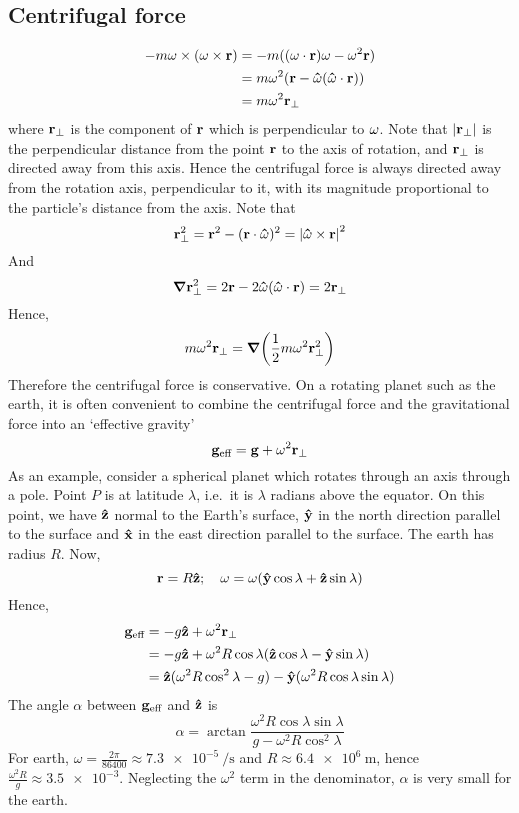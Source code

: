 \subsection{Centrifugal force}
\begin{align*}
	-m\vb\omega \times (\vb\omega \times \vb r) & = -m((\vb\omega \cdot \vb r)\vb\omega - \vb\omega^2\vb r) \\
	                                            & = m\omega^2(\vb r - \vu\omega(\vu\omega \cdot \vb r))     \\
	                                            & = m\omega^2 \vb r_\perp
\end{align*}
where \(\vb r_\perp\) is the component of \(\vb r\) which is perpendicular to \(\vb\omega\).
Note that \(\abs{\vb r_\perp}\) is the perpendicular distance from the point \(\vb r\) to the axis of rotation, and \(\vb r_\perp\) is directed away from this axis.
Hence the centrifugal force is always directed away from the rotation axis, perpendicular to it, with its magnitude proportional to the particle's distance from the axis.
Note that
\[
	\vb r_\perp^2 = \vb r^2 - (\vb r \cdot \vu\omega)^2 = \abs{\vu\omega \times \vb r}^2
\]
And
\[
	\grad \vb r_\perp^2 = 2\vb r - 2\vu\omega(\vu\omega \cdot \vb r) = 2\vb r_\perp
\]
Hence,
\[
	m\omega^2\vb r_\perp = \grad(\frac{1}{2}m\omega^2\vb r_\perp^2)
\]
Therefore the centrifugal force is conservative.
On a rotating planet such as the earth, it is often convenient to combine the centrifugal force and the gravitational force into an `effective gravity'
\[
	\vb g_{\text{eff}} = \vb g + \omega^2 \vb r_\perp
\]
As an example, consider a spherical planet which rotates through an axis through a pole.
Point \(P\) is at latitude \(\lambda\), i.e.\ it is \(\lambda\) radians above the equator.
On this point, we have \(\vu z\) normal to the Earth's surface, \(\vu y\) in the north direction parallel to the surface and \(\vu x\) in the east direction parallel to the surface.
The earth has radius \(R\).
Now,
\[
	\vb r = R\vu z;\quad \vb\omega = \omega(\vu y \cos\lambda + \vu z \sin\lambda)
\]
Hence,
\begin{align*}
	\vb g_\text{eff} & = -g\vu z + \omega^2 \vb r_\perp                                              \\
	                 & = -g\vu z + \omega^2 R\cos\lambda (\vu z \cos\lambda - \vu y \sin\lambda)     \\
	                 & = \vu z(\omega^2 R\cos^2\lambda - g) - \vu y(\omega^2R\cos\lambda\sin\lambda)
\end{align*}
The angle \(\alpha\) between \(\vb g_\text{eff}\) and \(\vu z\) is
\[
	\alpha = \arctan \frac{\omega^2R\cos\lambda\sin\lambda}{g - \omega^2R\cos^2\lambda}
\]
For earth, \(\omega = \frac{2\pi}{86400} \approx \SI{7.3e-5}{\per\second}\) and \(R \approx \SI{6.4e6}{\metre}\), hence \(\frac{\omega^2R}{g} \approx \num{3.5e-3}\).
Neglecting the \(\omega^2\) term in the denominator, \(\alpha\) is very small for the earth.

